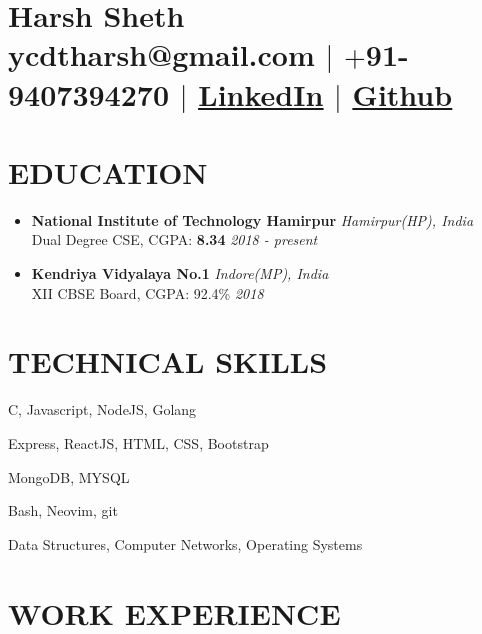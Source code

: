 \documentclass[12pt]{article}
\begin{document}
\section{\Huge{Harsh Sheth}\\ \large \normalfont ycdtharsh@gmail.com $|$ \normalfont $+$91-9407394270 $|$  \underline{\href{https://www.linkedin.com/in/harsh-sheth-2101}{LinkedIn}} $|$ \underline{\href{https://github.com/harsh-sheth}{Github}}}

\section{EDUCATION}
\begin{itemize}
  \item{
      \textbf{National Institute of Technology Hamirpur} \hfill \textit{Hamirpur(HP), India}\\
      Dual Degree CSE, CGPA: \textbf{8.34} \hfill \textit{2018 - present}
  } 
  \item{
      \textbf{Kendriya Vidyalaya No.1} \hfill \textit{Indore(MP), India}\\
      XII CBSE Board, CGPA: 92.4\% \hfill \textit{2018}
  }
\end{itemize}

\section{TECHNICAL SKILLS}
\begin{description}
  \setlength{\itemindent}{\parindent}
  \setlength{\itemsep}{0em}
  \item[Languages:]{C, Javascript, NodeJS, Golang}
  \item[Web Technologies:]{Express, ReactJS, HTML, CSS, Bootstrap}
  \item[Databases:]{MongoDB, MYSQL}
  \item[Tools:]{Bash, Neovim, git}
  \item[Coursework:]{Data Structures, Computer Networks, Operating Systems}
\end{description}

\section{WORK EXPERIENCE}
\end{document}
